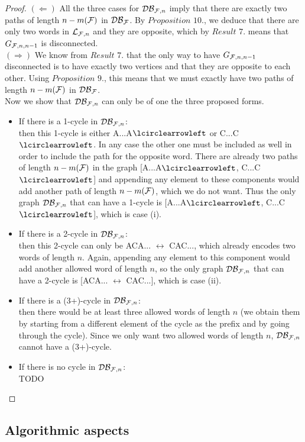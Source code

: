 \documentclass{article}
\begin{document}
\begin{proof}
	$(\Leftarrow)$ All the three cases for $\mathcal{DB}_{\mathcal{F}, n}$ imply that there are exactly two paths of length $n - m(\mathcal{F})$ in $\mathcal{DB}_{\mathcal{F}}$. By $Proposition$ $10.$, we deduce that there are only two words in $\mathcal{L}_{\mathcal{F}, n}$ and they are opposite, which by $Result$ $7.$ means that $G_{\mathcal{F}, n, n-1}$ is disconnected. \\
	
	$(\Rightarrow)$ We know from $Result$ $7.$ that the only way to have $G_{\mathcal{F}, n, n-1}$ disconnected is to  have exactly two vertices and that they are opposite to each other. Using $Proposition$ $9.$, this means that we must exactly have two paths of length $n - m(\mathcal{F})$ in $\mathcal{DB}_{\mathcal{F}}$. \\
	Now we show that $\mathcal{DB}_{\mathcal{F}, n}$ can only be of one the three proposed forms.
	\begin{itemize}
		\item If there is a 1-cycle in $\mathcal{DB}_{\mathcal{F}, n}$: \\
		then this 1-cycle is either A...A$\lcirclearrowleft$ or C...C$\lcirclearrowleft$. In any case the other one must be included as well in order to include the path for the opposite word. There are already two paths of length $n - m(\mathcal{F})$ in the graph [A...A$\lcirclearrowleft$, C...C$\lcirclearrowleft$] and appending any element to these components would add another path of length $n - m(\mathcal{F})$, which we do not want. Thus the only graph $\mathcal{DB}_{\mathcal{F}, n}$ that can have a 1-cycle is [A...A$\lcirclearrowleft$, C...C$\lcirclearrowleft$], which is case (i).
		\item If there is a 2-cycle in $\mathcal{DB}_{\mathcal{F}, n}$: \\
		then this 2-cycle can only be ACA... $\leftrightarrow$ CAC..., which already encodes two words of length $n$. Again, appending any element to this component would add another allowed word of length $n$, so the only graph $\mathcal{DB}_{\mathcal{F}, n}$ that can have a 2-cycle is [ACA... $\leftrightarrow$ CAC...], which is case (ii).
		\item If there is a (3+)-cycle in $\mathcal{DB}_{\mathcal{F}, n}$: \\
		then there would be at least three allowed words of length $n$ (we obtain them by starting from a different element of the cycle as the prefix and by going through the cycle). Since we only want two allowed words of length $n$, $\mathcal{DB}_{\mathcal{F}, n}$ cannot have a (3+)-cycle.
		\item If there is no cycle in $\mathcal{DB}_{\mathcal{F}, n}$: \\
		TODO
	\end{itemize}
\end{proof}

\subsection{Algorithmic aspects}
\end{document}
